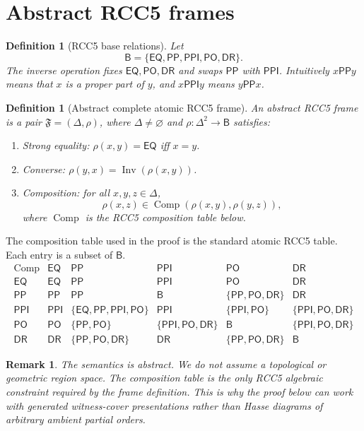 \documentclass[11pt]{article}
\newtheorem{definition}[theorem]{Definition}
\newtheorem{remark}[theorem]{Remark}
\newcommand{\Base}{\mathsf B}
\newcommand{\EQ}{\mathsf{EQ}}
\newcommand{\PP}{\mathsf{PP}}
\newcommand{\PPI}{\mathsf{PPI}}
\newcommand{\PO}{\mathsf{PO}}
\newcommand{\DR}{\mathsf{DR}}
\newcommand{\Inv}{\operatorname{Inv}}
\newcommand{\comp}{\operatorname{Comp}}
\begin{document}
\section{Abstract RCC5 frames}

\begin{definition}[RCC5 base relations]
Let
\[
  \Base=\{\EQ,\PP,\PPI,\PO,\DR\}.
\]
The inverse operation fixes \(\EQ,\PO,\DR\) and swaps \(\PP\) with \(\PPI\).  Intuitively \(x\PP y\) means that \(x\) is a proper part of \(y\), and \(x\PPI y\) means \(y\PP x\).
\end{definition}

\begin{definition}[Abstract complete atomic RCC5 frame]
An abstract RCC5 frame is a pair \(\mathfrak F=(\Delta,\rho)\), where \(\Delta\ne\varnothing\) and \(\rho:\Delta^2\to\Base\) satisfies:
\begin{enumerate}[label=(F\arabic*)]
\item \emph{Strong equality:} \(\rho(x,y)=\EQ\) iff \(x=y\).
\item \emph{Converse:} \(\rho(y,x)=\Inv(\rho(x,y))\).
\item \emph{Composition:} for all \(x,y,z\in\Delta\),
\[
  \rho(x,z)\in \comp(\rho(x,y),\rho(y,z)),
\]
where \(\comp\) is the RCC5 composition table below.
\end{enumerate}
\end{definition}

The composition table used in the proof is the standard atomic RCC5 table.  Each entry is a subset of \(\Base\).
\[
\begin{array}{c|ccccc}
\comp & \EQ & \PP & \PPI & \PO & \DR \\
\hline
\EQ & \EQ & \PP & \PPI & \PO & \DR \\
\PP & \PP & \PP & \Base & \{\PP,\PO,\DR\} & \DR \\
\PPI & \PPI & \{\EQ,\PP,\PPI,\PO\} & \PPI & \{\PPI,\PO\} & \{\PPI,\PO,\DR\} \\
\PO & \PO & \{\PP,\PO\} & \{\PPI,\PO,\DR\} & \Base & \{\PPI,\PO,\DR\} \\
\DR & \DR & \{\PP,\PO,\DR\} & \DR & \{\PP,\PO,\DR\} & \Base
\end{array}
\]

\begin{remark}
The semantics is abstract.  We do not assume a topological or geometric region space.  The composition table is the only RCC5 algebraic constraint required by the frame definition.  This is why the proof below can work with generated witness-cover presentations rather than Hasse diagrams of arbitrary ambient partial orders.
\end{remark}
\end{document}
